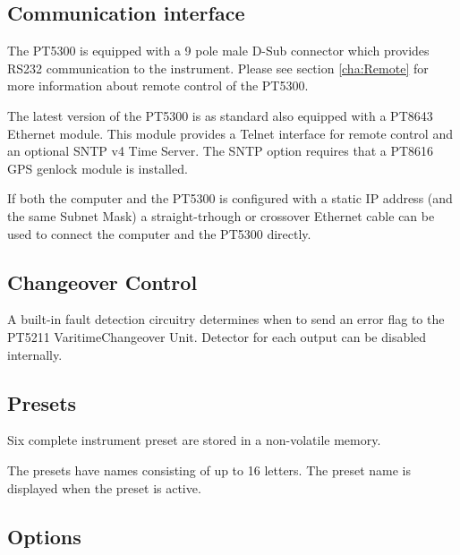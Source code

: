 \subsection{Communication interface}
The PT5300 is equipped with a 9 pole male D-Sub connector which provides RS232 communication to the instrument.
Please see section \ref{cha:Remote} for more information about remote control of the PT5300.

The latest version of the PT5300 is as standard also equipped with a PT8643 Ethernet module. This module provides a Telnet interface for remote control and an optional SNTP v4 Time Server. The SNTP option requires that a PT8616 GPS genlock module is installed.

\PasswordWarning

If both the computer and the PT5300 is configured with a static IP address (and the same Subnet Mask) a straight-trhough or crossover Ethernet cable can be used to connect the computer and the PT5300 directly.

\subsection{Changeover Control}
A built-in fault detection circuitry determines when to send an error flag to the PT5211 Varitime\TM Changeover Unit. Detector for each output can be disabled internally.

\subsection{Presets}
Six complete instrument preset are stored in a non-volatile memory.

The presets have names consisting of up to 16 letters. The preset name is displayed when the preset is active.

\clearpage
\subsection{Options}

\clearpage

\clearpage

\clearpage

\clearpage

\clearpage

\clearpage

\clearpage

\clearpage

\clearpage

\clearpage

\clearpage

\clearpage

\clearpage

\clearpage

\clearpage

\clearpage

